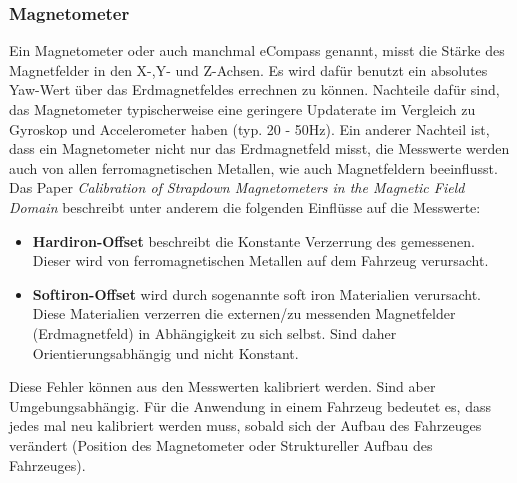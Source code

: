 \subsubsection{Magnetometer} \label{magneto}
Ein Magnetometer oder auch manchmal eCompass genannt, misst die Stärke des
Magnetfelder in den X-,Y- und Z-Achsen. Es wird dafür benutzt ein absolutes
Yaw-Wert über das Erdmagnetfeldes errechnen zu können. Nachteile dafür sind, das
Magnetometer typischerweise eine geringere Updaterate im Vergleich zu Gyroskop
und Accelerometer haben (typ. 20 - 50Hz). Ein anderer Nachteil ist, dass ein Magnetometer nicht nur das Erdmagnetfeld misst, die Messwerte werden auch von allen ferromagnetischen Metallen, wie auch Magnetfeldern beeinflusst. Das Paper \textit{\grqq Calibration of Strapdown Magnetometers in the
Magnetic Field Domain\grqq} \cite[Sec.~2]{magCalThearie} beschreibt unter anderem die folgenden Einflüsse auf die Messwerte:
\begin{itemize}
    \item \textbf{Hardiron-Offset} beschreibt die Konstante Verzerrung des
        gemessenen. Dieser wird von ferromagnetischen Metallen auf dem Fahrzeug verursacht.
    \item \textbf{Softiron-Offset} wird durch sogenannte \grqq soft iron\grqq
        Materialien verursacht. Diese Materialien verzerren die externen/zu
        messenden Magnetfelder (Erdmagnetfeld) in Abhängigkeit zu sich selbst. Sind daher Orientierungsabhängig und nicht Konstant.
\end{itemize}
Diese Fehler können aus den Messwerten kalibriert werden. Sind aber
Umgebungsabhängig. Für die Anwendung in einem Fahrzeug bedeutet es, dass jedes
mal neu kalibriert werden muss, sobald sich der Aufbau des Fahrzeuges verändert
(Position des Magnetometer oder Struktureller Aufbau des Fahrzeuges).

